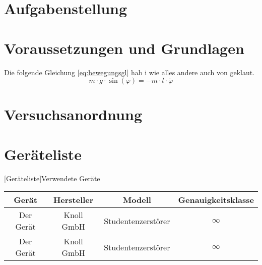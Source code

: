 \documentclass[11pt]{scrartcl}
\begin{document}

\tableofcontents
\newpage

\section{Aufgabenstellung}
\label{sec:aufgabenstellung}

\section{Voraussetzungen und Grundlagen}
\label{sec:voraussetzungen_grundlagen}
Die folgende Gleichung \ref{eq:bewegungsgl} hab i wie alles andere auch von \cite[S. 69]{ref:Beispiel} geklaut.
\begin{equation}
    \label{eq:bewegungsgl}
        m \cdot g \cdot \sin(\varphi) = -m \cdot l \cdot \ddot \varphi 
\end{equation}

\section{Versuchsanordnung}
\label{sec:versuchsanordnung}

    

\section{Geräteliste}
\label{sec:geraeteliste}
\begin{center}
    [Geräteliste]{Verwendete Geräte}  %
    \label{tab:geraeteliste}
    \vspace{3mm}  %
    \begin{tabular}{|c|c|c|c|}
        \hline
        Gerät           & Hersteller                & Modell        & Genauigkeitsklasse    \\ \hline
        Der Gerät    & Knoll GmbH    & Studentenzerstörer & $\infty$  \\ \hline
        Der Gerät    & Knoll GmbH    & Studentenzerstörer & $\infty$  \\ \hline
        \hline
    \end{tabular}
\end{center}
\end{document}
